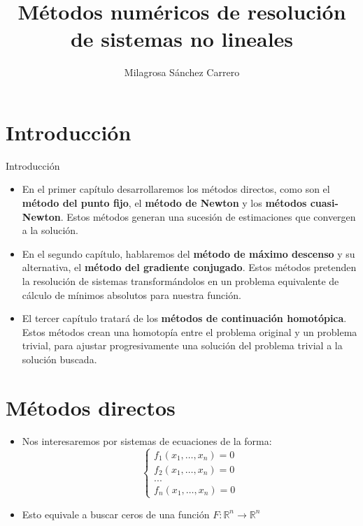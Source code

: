 \documentclass[a4paper,10pt]{beamer}
\title{Métodos numéricos de resolución de sistemas no lineales}
\author{Milagrosa Sánchez Carrero}
\date{}
\begin{document}
\begin{frame}
	\maketitle
\end{frame}


\section{Introducción}
\begin{frame}{Introducción}

\begin{itemize}
	\item En el primer capítulo desarrollaremos los métodos directos, como son el \textbf{método del punto fijo}, el \textbf{método de Newton} y los \textbf{métodos cuasi-Newton}. Estos métodos generan una sucesión de estimaciones que convergen a la solución.
	\pause
	\item En el segundo capítulo, hablaremos del \textbf{método de máximo descenso} y su alternativa, el \textbf{método del gradiente conjugado}. Estos métodos pretenden la resolución de sistemas transformándolos en un problema equivalente de cálculo de mínimos absolutos para nuestra función.
	\pause
	\item El tercer capítulo tratará de los \textbf{métodos de continuación homotópica}. Estos métodos crean una homotopía entre el problema original y un problema trivial, para ajustar progresivamente una solución del problema trivial a la solución buscada.
\end{itemize}
\end{frame}

\section{Métodos directos}

\begin{frame}
	\begin{itemize}
		\item Nos interesaremos por sistemas de ecuaciones de la forma:
		\[
			\begin{cases}
				f_1(x_1,\dots,x_n)  = 0 \\
				f_2(x_1,\dots,x_n)  = 0 \nonumber \\
				...                   \nonumber \\
				f_n(x_1,\dots,x_n)  = 0 \nonumber
			\end{cases}
		\]
		\pause
		\item Esto equivale a buscar ceros de una función $F : \mathbb{R}^n \to \mathbb{R}^n$
	\end{itemize}
\end{frame}
\end{document}
